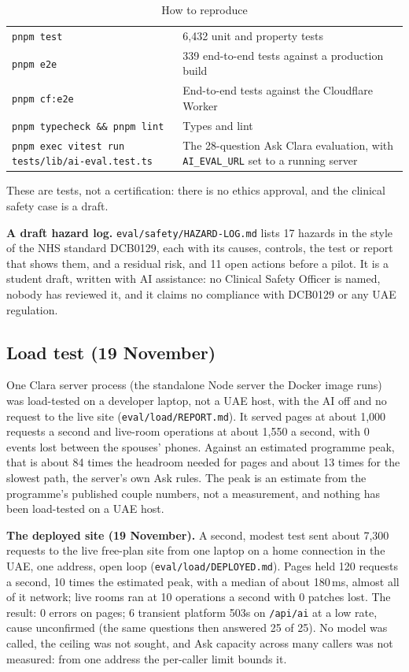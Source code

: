 \documentclass[10.5pt,a4paper]{article}
\newcommand{\toprl}{\arrayrulecolor{ink}\toprule\arrayrulecolor{rule}}
\newcommand{\code}[1]{\texttt{\small #1}}
\newcommand{\file}[1]{\leavevmode\textcolor{muted}{\texttt{\small #1}}}
\begin{document}
{\small
\begin{xltabular}{\textwidth}{@{}P{7.4cm}L@{}}
\caption{How to reproduce}\\
\toprl
\code{pnpm test} & 6,432 unit and property tests\\
\code{pnpm e2e} & 339 end-to-end tests against a production build\\
\code{pnpm cf:e2e} & End-to-end tests against the Cloudflare Worker\\
\code{pnpm typecheck \&\& pnpm lint} & Types and lint\\
\code{pnpm exec vitest run tests/lib/ai-eval.test.ts} & The 28-question Ask Clara evaluation, with \code{AI\_EVAL\_URL} set to a running server\\
\bottomrule
\end{xltabular}}

These are tests, not a certification: there is no ethics approval, and the clinical safety case is a draft.

\textbf{A draft hazard log.} \file{eval/safety/HAZARD-LOG.md} lists 17 hazards in the style of the NHS standard
DCB0129, each with its causes, controls, the test or report that shows them, and a residual risk, and 11 open actions
before a pilot. It is a student draft, written with AI assistance: no Clinical Safety Officer is named, nobody has
reviewed it, and it claims no compliance with DCB0129 or any UAE regulation.

\subsection{Load test (19 November)}\label{sec:load}

One Clara server process (the standalone Node server the Docker image runs) was load-tested on a developer laptop,
not a UAE host, with the AI off and no request to the live site (\file{eval/load/REPORT.md}). It served pages at about
1,000 requests a second and live-room operations at about 1,550 a second, with 0 events lost between the spouses'
phones. Against an estimated programme peak, that is about 84 times the headroom needed for pages and about 13 times
for the slowest path, the server's own Ask rules. The peak is an estimate from the programme's published couple
numbers, not a measurement, and nothing has been load-tested on a UAE host.

\textbf{The deployed site (19 November).} A second, modest test sent about 7,300 requests to the live free-plan site
from one laptop on a home connection in the UAE, one address, open loop (\file{eval/load/DEPLOYED.md}). Pages held
120 requests a second, 10 times the estimated peak, with a median of about 180\,ms, almost all of it network; live
rooms ran at 10 operations a second with 0 patches lost. The result: 0 errors on pages; 6 transient platform 503s on
\code{/api/ai} at a low rate, cause unconfirmed (the same questions then answered 25 of 25). No model was called, the
ceiling was not sought, and Ask capacity across many callers was not measured: from one address the per-caller limit
bounds it.
\end{document}
